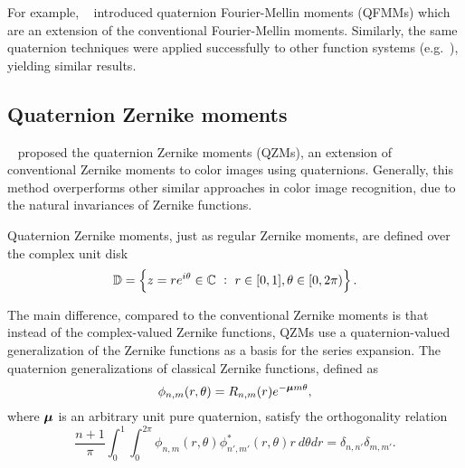 
For example, \citeauthor{qfmm}~\cite{qfmm} introduced quaternion Fourier-Mellin moments (QFMMs) which are an extension of the conventional Fourier-Mellin moments. Similarly, the same quaternion techniques were applied successfully to other function systems (e.g.~\cite{Shao, chebyshev-fourier}), yielding similar results.


\subsection{Quaternion Zernike moments}\label{sec:qzm}
\citeauthor{qzm}~\cite{qzm,qzmi} proposed the quaternion Zernike moments (QZMs), an extension of conventional Zernike moments to color images using quaternions. Generally, this method overperforms other similar approaches in color image recognition, due to the natural invariances of Zernike functions.

Quaternion Zernike moments, just as regular Zernike moments, are defined over the complex unit disk
\[
	\D = \left\{ z = re^{i\theta}\in\C \ :\ r\in[0,1],\theta\in[0,2\pi)\right\}.
\]

The main difference, compared to the conventional Zernike moments is that instead of the complex-valued Zernike functions, QZMs use a quaternion-valued generalization of the Zernike functions as a basis for the series expansion. The quaternion generalizations of classical Zernike functions, defined as 
\[
	\phi_{n,m}(r,\theta) = R_{n,m}(r) e^{-\boldsymbol{\mu} m\theta},
\]
where $\boldsymbol{\mu}$ is an arbitrary unit pure quaternion, satisfy the orthogonality relation
\begin{equation}\label{QZortho}
	\frac{n+1}{\pi} \int_0^1 \int_0^{2\pi} \phi_{n,m}(r,\theta) \phi^*_{n',m'}(r,\theta) r \ d\theta dr = \delta_{n,n'}\delta_{m,m'}.
\end{equation}

